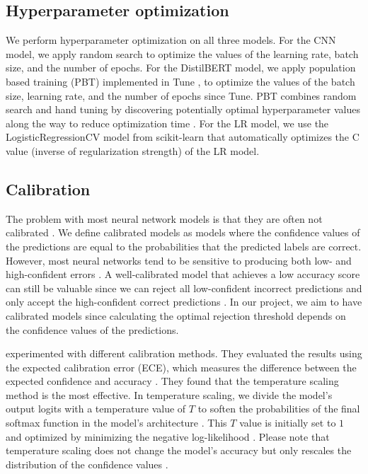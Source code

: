 \subsection{Hyperparameter optimization}
We perform hyperparameter optimization on all three models.
%
For the CNN model, we apply random search to optimize the values of the learning rate, batch size, and the number of epochs.
%
For the DistilBERT model, we apply population based training (PBT) \citep{jaderberg2017population} implemented in Tune \citep{liaw2018tune}, to optimize the values of the batch size, learning rate, and the number of epochs since Tune.
%
PBT combines random search and hand tuning by discovering potentially optimal hyperparameter values along the way to reduce optimization time \citep{jaderberg2017population}.
%
For the LR model, we use the LogisticRegressionCV model from scikit-learn that automatically optimizes the C value (inverse of regularization strength) of the LR model.

\subsection{Calibration}
The problem with most neural network models is that they are often not calibrated \citep{guo2017calibration,sayin2021science}.
%
We define calibrated models as models where the confidence values of the predictions are equal to the probabilities that the predicted labels are correct.
%
However, most neural networks tend to be sensitive to producing both low- and high-confident errors \citep{guo2017calibration, sayin2021science}.
%
A well-calibrated model that achieves a low accuracy score can still be valuable since we can reject all low-confident incorrect predictions and only accept the high-confident correct predictions \citep{sayin2021science}.
%
In our project, we aim to have calibrated models since calculating the optimal rejection threshold depends on the confidence values of the predictions.
%

%
\citet{guo2017calibration} experimented with different calibration methods.
%
They evaluated the results using the expected calibration error (ECE), which measures the difference between the expected confidence and accuracy \citep{guo2017calibration}.
%
They found that the temperature scaling method is the most effective.
%
In temperature scaling, we divide the model's output logits with a temperature value of $T$ to soften the probabilities of the final softmax function in the model's architecture \citep{guo2017calibration}.
%
This $T$ value is initially set to $1$ and optimized by minimizing the negative log-likelihood \citep{guo2017calibration}.
%
Please note that temperature scaling does not change the model's accuracy but only rescales the distribution of the confidence values \citep{guo2017calibration}.
%

